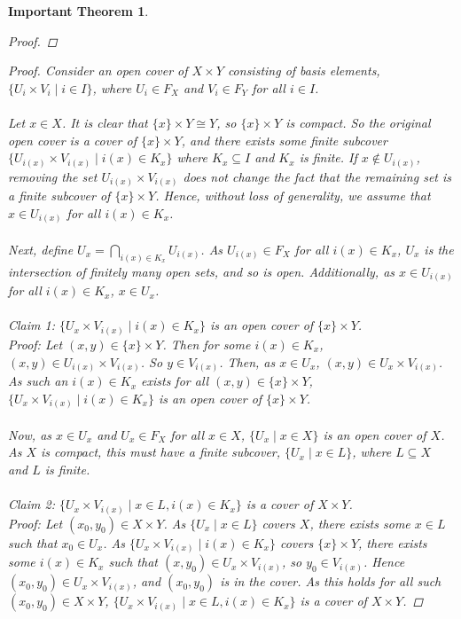 \documentclass[11pt]{article}
\newtheorem{theorem}{Important Theorem}
\begin{document}
\begin{theorem}
\begin{proof}
\end{proof}
\newpage
\begin{proof}
Consider an open cover of $X \times Y$ consisting of basis elements, $\{U_i \times V_i \mid i \in I\}$, where $U_i \in F_X$ and $V_i \in F_Y$ for all $i \in I$.
\\
\\
Let $x \in X$.  It is clear that $\{x\} \times Y \cong Y$, so $\{x\} \times Y$ is compact.  So the original open cover is a cover of $\{x\} \times Y$, and there exists some finite subcover $\{U_{i(x)} \times V_{i(x)} \mid i(x) \in K_x\}$ where $K_x \subseteq I$ and $K_x$ is finite.  If $x \notin U_{i(x)}$, removing the set $U_{i(x)} \times V_{i(x)}$ does not change the fact that the remaining set is a finite subcover of $\{x\} \times Y$.  Hence, without loss of generality, we assume that $x \in U_{i(x)}$ for all $i(x) \in K_x$.
\\
\\
Next, define $\displaystyle{U_x = \bigcap_{i(x) \in K_x} U_{i(x)}}$.  As $U_{i(x)} \in F_X$ for all $i(x) \in K_x$, $U_x$ is the intersection of finitely many open sets, and so is open.  Additionally, as $x \in U_{i(x)}$ for all $i(x) \in K_x$, $x \in U_x$.
\\
\\
Claim 1: $\{U_x \times V_{i(x)} \mid i(x) \in K_x\}$ is an open cover of $\{x\} \times Y$.
\\
Proof: Let $(x,y) \in \{x\} \times Y$.  Then for some $i(x) \in K_x$, $(x,y) \in U_{i(x)} \times V_{i(x)}$.  So $y \in V_{i(x)}$.  Then, as $x \in U_x$, $(x,y) \in U_x \times V_{i(x)}$.  As such an $i(x) \in K_x$ exists for all $(x,y) \in \{x\} \times Y$, $\{U_x \times V_{i(x)} \mid i(x) \in K_x\}$ is an open cover of $\{x\} \times Y$.
\\
\\
Now, as $x \in U_x$ and $U_x \in F_X$ for all $x \in X$, $\{U_x \mid x \in X\}$ is an open cover of $X$.  As $X$ is compact, this must have a finite subcover, $\{U_x \mid x \in L\}$, where $L \subseteq X$ and $L$ is finite.
\\
\\
Claim 2: $\{U_x \times V_{i(x)} \mid x \in L, i(x) \in K_x\}$ is a cover of $X \times Y$.
\\
Proof: Let $(x_0,y_0) \in X \times Y$.  As $\{U_x \mid x \in L\}$ covers $X$, there exists some $x \in L$ such that $x_0 \in U_x$.  As $\{U_x \times V_{i(x)} \mid i(x) \in K_x\}$ covers $\{x\} \times Y$, there exists some $i(x) \in K_x$ such that $(x,y_0) \in U_x \times V_{i(x)}$, so $y_0 \in V_{i(x)}$.  Hence $(x_0, y_0) \in U_x \times V_{i(x)}$, and $(x_0,y_0)$ is in the cover.  As this holds for all such $(x_0,y_0) \in X \times Y$, $\{U_x \times V_{i(x)} \mid x \in L, i(x) \in K_x\}$ is a cover of $X \times Y$.

\end{proof}
\end{theorem}
\end{document}
